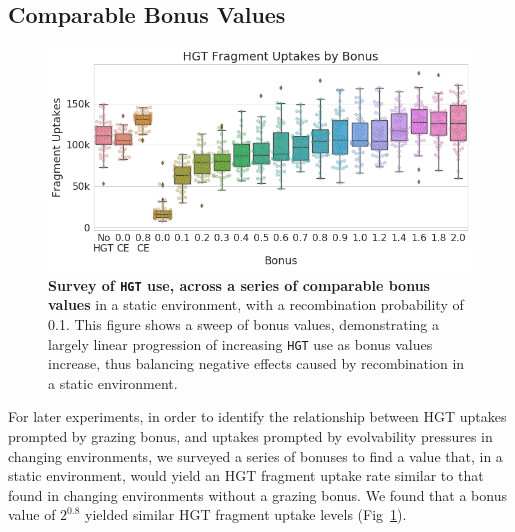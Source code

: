 \documentclass[PhD]{msu-thesis}
\begin{document}
\begin{appendices}
\section{Comparable Bonus Values}
	\begin{figure}[!h]
	\includegraphics[trim={0 0 0 0}, clip, width=0.85\columnwidth]{figures/A2/a2-hgt-bonusvsce-hgtuse.png}
	\caption{\textbf{Survey of \texttt{HGT} use, across a series of comparable bonus values} in a static environment, with a recombination probability of 0.1. This figure shows a sweep of bonus values, demonstrating a largely linear progression of increasing \texttt{HGT} use as bonus values increase, thus balancing negative effects caused by recombination in a static environment.
	}
	\label{fig:a2-hgt-bonusvsce-hgtuse}
	\end{figure}
For later experiments, in order to identify the relationship between HGT uptakes prompted by grazing bonus, and uptakes prompted by evolvability pressures in changing environments, we surveyed a series of bonuses to find a value that, in a static environment, would yield an HGT fragment uptake rate similar to that found in changing environments without a grazing bonus. We found that a bonus value of $2^{0.8}$ yielded similar HGT fragment uptake levels (Fig~\ref{fig:a2-hgt-bonusvsce-hgtuse}).






\end{appendices}
\end{document}
